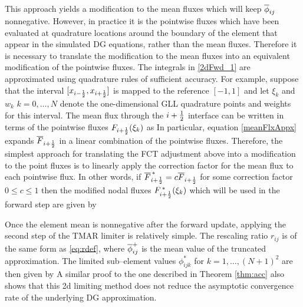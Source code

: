 \documentclass{ametsoc}
\begin{document}
This approach yields a modification to the mean fluxes which will keep $\overline{\phi}_{ij}$ nonnegative. However, in practice it is the pointwise fluxes which have been evaluated at quadrature locations around the boundary of the element that appear in the simulated  DG equations, rather than the mean fluxes. Therefore it is necessary to translate the modification to the mean fluxes into an equivalent modification of the pointwise fluxes. The integrals in \eqref{2dFwd_1} are approximated using quadrature rules of sufficient accuracy. For example, suppose that the interval $[x_{i-\frac{1}{2}} , x_{i+\frac{1}{2}}]$ is mapped to the reference $[-1,1]$ and let $\xi_k$ and $w_k$ $k=0,\dots,N$ denote the one-dimensional GLL quadrature points and weights for this interval. The mean flux through the $i+\frac{1}{2}$ interface can be written in terms of the pointwise fluxes $F_{i+\frac{1}{2}}(\xi_k)$ as
In particular, equation \eqref{meanFlxAppx} expands $\overline{F}_{i+\frac{1}{2}}$ in a linear combination of the pointwise fluxes. Therefore, the simplest approach for translating the FCT adjustment above into a modification to the point fluxes is to linearly apply the correction factor for the mean flux to each pointwise flux. In other words, if $\overline{F}_{i+\frac{1}{2}}^{\,*} = c \overline{F}_{i+\frac{1}{2}}$ for some correction factor $0\leq c \leq1$ then the modified nodal fluxes $F_{i+\frac{1}{2}}^{\,*}(\xi_k)$ which will be used in the forward step are given by

Once the element mean is nonnegative after the forward update, applying the second step of the TMAR limiter is relatively simple. The rescaling ratio $r_{ij}$ is of the same form as \eqref{eq:rdef},
where $\overline{\phi}^+_{ij}$ is the mean value of the truncated approximation. The limited sub--element values $\phi^*_{ijk}$ for $k=1,\dots,(N+1)^2$ are then given by
A similar proof to the one described in Theorem \ref{thm:acc} also shows that this 2d limiting method does not reduce the asymptotic convergence rate of the underlying DG approximation.

\end{document}
